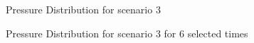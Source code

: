 \documentclass[12pt,letterpaper,titlepage]{article}
\begin{document}
\begin{figure}[p]
\centering
{}
\caption{\label{press}Pressure Distribution for scenario 3}
\end{figure}
\begin{figure}[p]
\centering
{}
\caption{\label{p12510}Pressure Distribution for scenario 3 for 6 selected times}
\end{figure}
\end{document}

